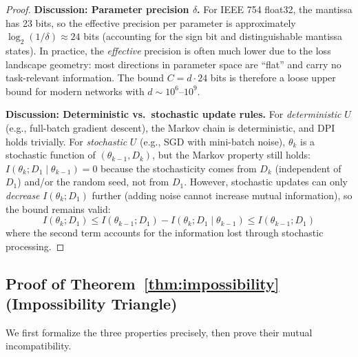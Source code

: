 \documentclass{article}
\begin{document}
\begin{proof}
\textbf{Discussion: Parameter precision $\delta$.}
For IEEE 754 float32, the mantissa has 23 bits, so the effective precision per parameter is approximately $\log_2(1/\delta) \approx 24$ bits (accounting for the sign bit and distinguishable mantissa states). In practice, the \emph{effective} precision is often much lower due to the loss landscape geometry: most directions in parameter space are ``flat'' and carry no task-relevant information. The bound $C = d \cdot 24$ bits is therefore a loose upper bound for modern networks with $d \sim 10^6$--$10^9$.

\textbf{Discussion: Deterministic vs.\ stochastic update rules.}
For \emph{deterministic} $U$ (e.g., full-batch gradient descent), the Markov chain is deterministic, and DPI holds trivially. For \emph{stochastic} $U$ (e.g., SGD with mini-batch noise), $\theta_k$ is a stochastic function of $(\theta_{k-1}, D_k)$, but the Markov property still holds: $I(\theta_k; D_1 \mid \theta_{k-1}) = 0$ because the stochasticity comes from $D_k$ (independent of $D_1$) and/or the random seed, not from $D_1$. However, stochastic updates can only \emph{decrease} $I(\theta_k; D_1)$ further (adding noise cannot increase mutual information), so the bound remains valid:
\begin{equation}
    I(\theta_k; D_1) \leq I(\theta_{k-1}; D_1) - I(\theta_k; D_1 \mid \theta_{k-1}) \leq I(\theta_{k-1}; D_1)
\end{equation}
where the second term accounts for the information lost through stochastic processing.
\end{proof}


\subsection{Proof of Theorem~\ref{thm:impossibility} (Impossibility Triangle)}
\label{app:proof_impossibility}

We first formalize the three properties precisely, then prove their mutual incompatibility.
\end{document}
